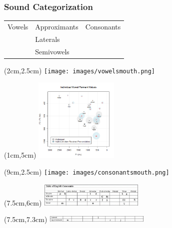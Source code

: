 \documentclass[12pt, table]{beamer}
\begin{document}
\begin{frame}
\frametitle{Sound Categorization}
\begin{tabularx}{\textwidth}{Y YY}
Vowels & Approximants & Consonants\\
& Laterals &\\
& Semivowels &\\
\end{tabularx}
\begin{textblock*}{2cm}(2cm,2.5cm)
\texttt{[image: images/vowelsmouth.png]}
\end{textblock*}
\begin{textblock*}{4cm}(1cm,5cm)
\includegraphics[width=4cm]{images/vowelchart.png}
\end{textblock*}
\begin{textblock*}{2cm}(9cm,2.5cm)
\texttt{[image: images/consonantsmouth.png]}
\end{textblock*}
\begin{textblock*}{6cm}(7.5cm,6cm)
\includegraphics[width=5cm]{images/consonantschart.png}
\end{textblock*}
\begin{textblock*}{6cm}(7.5cm,7.3cm)
\includegraphics[width=5cm]{images/lateralschart.png}
\end{textblock*}
\end{frame}
\end{document}
